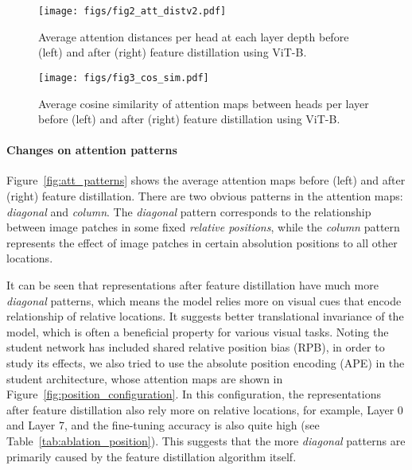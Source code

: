 \documentclass{article}
\begin{document}
\begin{figure}
     \centering
     \begin{minipage}{.50\textwidth}
      \centering
       \texttt{[image: figs/fig2\_att\_distv2.pdf]}
       \caption{Average attention distances per head at each layer depth before (left) and after (right) feature distillation using ViT-B.}
       \label{fig:att_distance}
     \end{minipage}\hspace{5pt}
     \begin{minipage}{.465\textwidth}
       \centering
      \texttt{[image: figs/fig3\_cos\_sim.pdf]}
       \caption{Average cosine similarity of attention maps between heads per layer before (left) and after (right) feature distillation using ViT-B.}
       \label{fig:att_similarity}
     \end{minipage}
 \end{figure}

\paragraph{Changes on attention patterns}

Figure~\ref{fig:att_patterns} shows the average attention maps before (left) and after (right) feature distillation. There are two obvious patterns in the attention maps: \emph{diagonal} and \emph{column}. The \emph{diagonal} pattern corresponds to the relationship between image patches in some fixed \emph{relative positions}, while the \emph{column} pattern represents the effect of image patches in certain absolution positions to all other locations.

It can be seen that representations after feature distillation have much more \emph{diagonal} patterns, which means the model relies more on visual cues that encode relationship of relative locations. It suggests better translational invariance of the model, which is often a beneficial property for various visual tasks. 
Noting the student network has included shared relative position bias (RPB), in order to study its effects, we also tried to use the absolute position encoding (APE) in the student architecture, whose attention maps are shown in Figure~\ref{fig:position_configuration}. In this configuration, the representations after feature distillation also rely more on relative locations, for example, Layer 0 and Layer 7, and the fine-tuning accuracy is also quite high (see Table~\ref{tab:ablation_position}). This suggests that the more \emph{diagonal} patterns are primarily caused by the feature distillation algorithm itself.
\end{document}
